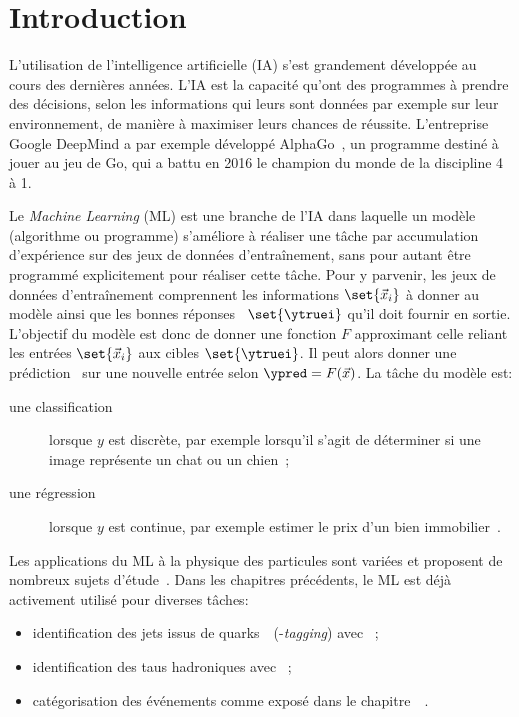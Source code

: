 \section{Introduction}\label{chapter-ML-section-intro}
L'utilisation de l'intelligence artificielle (IA) s'est grandement développée au cours des dernières années.
L'IA est la capacité qu'ont des programmes à prendre des décisions, selon les informations qui leurs sont données par exemple sur leur environnement, de manière à maximiser leurs chances de réussite.
L'entreprise Google DeepMind a par exemple développé AlphaGo~\cite{alphago},
un programme destiné à jouer au jeu de Go,
qui a battu en 2016 le champion du monde de la discipline 4 à 1.
\par
Le \emph{Machine Learning} (ML) est une branche de l'IA
dans laquelle un modèle (algorithme ou programme) s'améliore à réaliser une tâche par
accumulation d'expérience sur des jeux de données d'entraînement,
sans pour autant être programmé explicitement pour réaliser cette tâche.
Pour y parvenir,
les jeux de données d'entraînement comprennent les informations $\set{\vec{x}_i}$ à donner au modèle
ainsi que les \og bonnes réponses \fg\ $\set{\ytruei}$ qu'il doit fournir en sortie.
L'objectif du modèle est donc de donner une fonction $F$ approximant celle reliant les entrées $\set{\vec{x}_i}$ aux cibles $\set{\ytruei}$.
Il peut alors donner une prédiction \ypred\ sur une nouvelle entrée selon $\ypred=F(\vec{x})$.
La tâche du modèle est:
\begin{description}
\item[une classification] lorsque $y$ est discrète, par exemple lorsqu'il s'agit de déterminer si une image représente un chat ou un chien~\cite{datafrog_img_reco};
\item[une régression] lorsque $y$ est continue, par exemple estimer le prix d'un bien immobilier~\cite{house_prices_regression}.
\end{description}
\par
Les applications du ML à la physique des particules sont variées et proposent de nombreux sujets d'étude~\cite{Gael_thesis,scham_moritz_2020_21993,kopf_tanja_2019_21500,Baldi_2015}.
Dans les chapitres précédents, le ML est déjà activement utilisé pour diverses tâches:
\begin{itemize}
\item identification des jets issus de quarks~\quarkb\ (\quarkb-\emph{tagging}) avec \DeepCSV~\cite{jet_flavor_deep_nn,Sirunyan_heavy_flavor_jets_2018,DeepJet};
\item identification des taus hadroniques avec \DEEPTAU~\cite{CMS-DP-2019-033};
\item catégorisation des événements comme exposé dans le chapitre~~\cite{CMS-NOTE-2019-177,CMS-NOTE-2019-178}.
\end{itemize}
